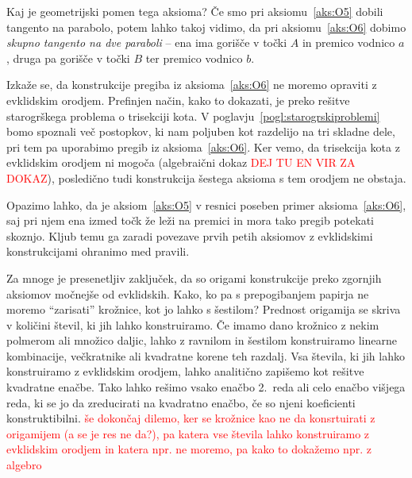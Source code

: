 Kaj je geometrijski pomen tega aksioma? Če smo pri aksiomu~\ref{aks:O5} dobili tangento na parabolo, potem lahko takoj vidimo, da pri aksiomu~\ref{aks:O6} dobimo \emph{skupno tangento na dve paraboli} -- ena ima gorišče v točki $A$ in premico vodnico $a$, druga pa gorišče v točki $B$ ter premico vodnico $b$.

Izkaže se, da konstrukcije pregiba iz aksioma~\ref{aks:O6} ne moremo opraviti z evklidskim orodjem. Prefinjen način, kako to dokazati, je preko rešitve starogrškega problema o trisekciji kota. V poglavju~\ref{pogl:starogrskiproblemi} bomo spoznali več postopkov, ki nam poljuben kot razdelijo na tri skladne dele, pri tem pa uporabimo pregib iz aksioma~\ref{aks:O6}. Ker vemo, da trisekcija kota z evklidskim orodjem ni mogoča (algebraični dokaz \textcolor{red}{DEJ TU EN VIR ZA DOKAZ}), posledično tudi konstrukcija šestega aksioma s tem orodjem ne obstaja.

Opazimo lahko, da je aksiom~\ref{aks:O5} v resnici poseben primer aksioma~\ref{aks:O6}, saj pri njem ena izmed točk že leži na premici in mora tako pregib potekati skoznjo. Kljub temu ga zaradi povezave prvih petih aksiomov z evklidskimi konstrukcijami ohranimo med pravili.

Za mnoge je presenetljiv zaključek, da so origami konstrukcije preko zgornjih aksiomov močnejše od evklidskih. Kako, ko pa s prepogibanjem papirja ne moremo ``zarisati'' krožnice, kot jo lahko s šestilom? Prednost origamija se skriva v količini števil, ki jih lahko konstruiramo. Če imamo dano krožnico z nekim polmerom ali množico daljic, lahko z ravnilom in šestilom konstruiramo linearne kombinacije, večkratnike ali kvadratne korene teh razdalj. Vsa števila, ki jih lahko konstruiramo z evklidskim orodjem, lahko analitično zapišemo kot rešitve kvadratne enačbe. Tako lahko rešimo vsako enačbo 2.\ reda ali celo enačbo višjega reda, ki se jo da zreducirati na kvadratno enačbo, če so njeni koeficienti konstruktibilni. \textcolor{red}{še dokončaj dilemo, ker se krožnice kao ne da konsrtuirati z origamijem (a se je res ne da?), pa katera vse števila lahko konstruiramo z evklidskim orodjem in katera npr. ne moremo, pa kako to dokažemo npr. z algebro}